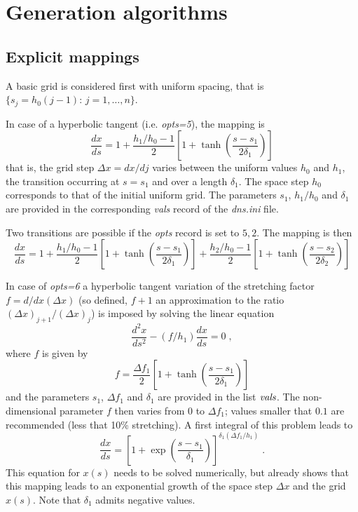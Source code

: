\section{Generation algorithms}

\subsection{Explicit mappings}
A basic grid is considered first with uniform spacing, that is
$\{s_j=h_0(j-1):\, j = 1,\ldots,n\}$. 

In case of a hyperbolic tangent (i.e. {\it opts=5}), the mapping is
\begin{equation}
\frac{dx}{ds} = 1 + \frac{h_1/h_0-1}{2}\left[ 1 + \tanh\left(\frac{s-s_1}{2\delta_1}\right)\right]
\end{equation}
that is, the grid step $\Delta x =dx/dj$ varies between the uniform values $h_0$
and $h_1$, the transition occurring at $s=s_1$ and over a length $\delta_1$. The
space step $h_0$ corresponds to that of the initial uniform grid. The parameters
$s_1$, $h_1/h_0$ and $\delta_1$ are provided in the corresponding {\it vals}
record of the {\it dns.ini} file.

Two transitions are possible if the {\it opts} record is set to $5,2$. The
mapping is then
\begin{equation}
\frac{dx}{ds} = 1 
+ \frac{h_1/h_0-1}{2}\left[ 1 + \tanh\left(\frac{s-s_1}{2\delta_1}\right)\right]
+ \frac{h_2/h_0-1}{2}\left[ 1 + \tanh\left(\frac{s-s_2}{2\delta_2}\right)\right]
\end{equation}

In case of {\it opts=6} a hyperbolic tangent variation of the stretching factor
$f=d/dx (\Delta x)$ (so defined, $f+1$ an approximation to the ratio $(\Delta x)
_{j+1}/(\Delta x) _{j} $) is imposed by solving the linear equation
\begin{equation}
\frac{d^2x}{ds^2} - (f/h_1)\frac{dx}{ds} = 0 \;,
\end{equation}
where $f$ is given by
\begin{equation}
f = \frac{\Delta f_1}{2}\left[ 1 + \tanh\left(\frac{s-s_1}{2\delta_1}\right)\right]
\end{equation}
and the parameters $s_1$, $\Delta f_1$ and $\delta_1$ are provided in the list
${\it vals}$. The non-dimensional parameter $f$ then varies from $0$ to $\Delta
f_1$; values smaller that $0.1$ are recommended (less that 10\% stretching). A
first integral of this problem leads to
\begin{equation}
\frac{dx}{ds} =
\left[1+\exp\left(\frac{s-s_1}{\delta_1}\right)\right]^{\delta_1(\Delta f_1/h_1)} \;.
\end{equation}
This equation for $x(s)$ needs to be solved numerically, but already shows that
this mapping leads to an exponential growth of the space step $\Delta x$ and the
grid $x(s)$. Note that $\delta_1$ admits negative values.

